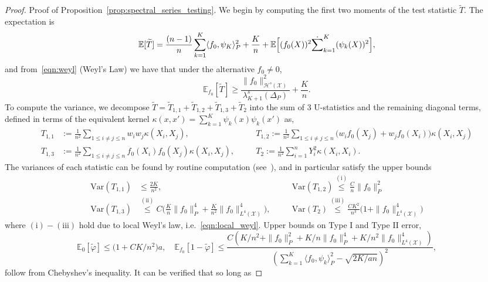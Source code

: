 \documentclass[aos]{imsart}
\theoremstyle{plain}
\theoremstyle{definition}
\theoremstyle{remark}
\newcommand{\Ebb}{\mathbb{E}}
\newcommand{\dotp}[2]{\langle #1, #2 \rangle}
\newcommand{\wt}[1]{\widetilde{#1}}
\newcommand{\mc}[1]{\mathcal{#1}}
\newcommand{\Var}{\mathrm{Var}}
\newcommand{\1}{\mathbf{1}}
\begin{document}
\begin{proof}{Proof of Proposition~\ref{prop:spectral_series_testing}.}
We begin by computing the first two moments of the test statistic $\wt{T}$. The expectation is
\begin{align*}
\Ebb[\wt{T}] = \frac{(n - 1)}{n} \sum_{k = 1}^{K} \dotp{f_0}{\psi_K}_P^2 + \frac{K}{n} + \Ebb\Bigl[(f_0(X))^2 \dot \sum_{k = 1}^{K} (\psi_k(X))^2\Bigr],
\end{align*}
and from~\eqref{eqn:weyl} (Weyl's Law) we have that under the alternative $f_0 \neq 0$,
\begin{equation*}
\Ebb_{f_0}[\wt{T}] \geq \frac{\|f_0\|_{\mc{H}^s(\mc{X})}^2}{\lambda_{K + 1}^s(\Delta_{P})} + \frac{K}{n}.
\end{equation*}
To compute the variance, we decompose $\wt{T} = \wt{T}_{1,1} + \wt{T}_{1,2} + \wt{T}_{1,3} + \wt{T}_2$ into the sum of 3 U-statistics and the remaining diagonal terms, defined in terms of the equivalent kernel $\kappa(x,x') = \sum_{k = 1}^{K} \psi_k(x) \psi_k(x')$ as,
\begin{align*}
T_{1,1} & := \frac{1}{n^2} \sum_{1 \leq i \neq j \leq n} w_i w_j \kappa(X_i,X_j),\quad && T_{1,2} := \frac{1}{n^2} \sum_{1 \leq i \neq j \leq n} \bigl(w_i f_0(X_j) + w_jf_0(X_i)\bigr)\kappa(X_i,X_j) \\
T_{1,3} & := \frac{1}{n^2} \sum_{1 \leq i \neq j \leq n} f_0(X_i) f_0(X_j) \kappa(X_i,X_j), \quad && T_2 := \frac{1}{n^2} \sum_{i = 1}^{n} Y_i^2 \kappa(X_i,X_i).
\end{align*}
The variances of each statistic can be found by routine computation (see~\cite{ingster2009}), and in particular satisfy the upper bounds
\begin{align*}
\Var(T_{1,1}) & \leq \frac{2K}{n^2}, \quad && \Var(T_{1,2}) \overset{\mathrm{(i)}}{\leq} \frac{C}{n}\|f_0\|_P^2\\
\Var(T_{1,3}) & \overset{\mathrm{(ii)}}{\leq} C\biggl(\frac{K}{n}\|f_0\|_P^4 + \frac{K}{n^2}\|f_0\|_{L^4(\mc{X})}^4\biggr), \quad && \Var(T_{2}) \overset{\mathrm{(iii)}}{\leq} \frac{CK^2}{n^3}\biggl(1 + \|f_0\|_{L^4(\mc{X})}^4\biggr)
\end{align*}
where $\mathrm{(i)}-\mathrm{(iii)}$ hold due to local Weyl's law, i.e.~\eqref{eqn:local_weyl}. Upper bounds on Type I and Type II error,
\begin{equation*}
\Ebb_0[\wt{\varphi}] \leq \biggl(1 + CK/n^2\biggr)a, \quad \Ebb_{f_0}[1 - \wt{\varphi}] \leq \frac{C(K/n^2 + \|f_0\|_P^2 + K/n \|f_0\|_P^4 + K/n^2 \|f_0\|_{L^4(\mc{X})}^4)}{(\sum_{k = 1}^{K} \dotp{f_0}{\psi_k}_P^2 - \sqrt{2K/an})^2},
\end{equation*}
follow from Chebyshev's inequality. It can be verified that so long as

\end{proof}
\end{document}
